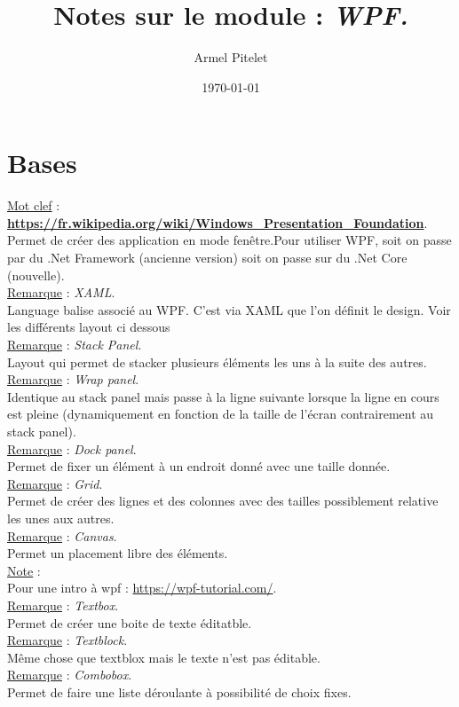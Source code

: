 \documentclass[a4paper,12pt,twoside]{article}
\title{Notes sur le module : \textit{WPF.}}
\author{Armel Pitelet}
\date{\today}
\newcommand{\urlcolor}{magenta}  %
\newcommand{\keycolor}{purple} %
\newcommand{\rem}[2]{\noindent\underline{Remarque} : \textit{#1}.\\ \indent #2}
\newcommand{\note}[1]{\noindent\underline{Note} : \\ \indent #1}
\newcommand{\keyref}[2]{\hypersetup{urlcolor=\keycolor} \href{#1}{\textbf{#2}}\hypersetup{urlcolor=\urlcolor}}
\newcommand{\keyword}[3]{\noindent\underline{Mot clef} : \keyref{#1}{#2}. \\ \indent #3}
\begin{document}
\maketitle
\tableofcontents

\section{Bases}

\keyword{WPF}{https://fr.wikipedia.org/wiki/Windows\_Presentation\_Foundation}{Permet de créer des application en mode fenêtre.Pour utiliser WPF, soit on passe par du .Net Framework (ancienne version) soit on passe sur du .Net Core (nouvelle).}\\

\rem{XAML}{Language balise associé au WPF. C'est via XAML que l'on définit le design. Voir les différents layout ci dessous}\\

\rem{Stack Panel}{Layout qui permet de stacker plusieurs éléments les uns à la suite des autres.}\\

\rem{Wrap panel}{Identique au stack panel mais passe à la ligne suivante lorsque la ligne en cours est pleine (dynamiquement en fonction de la taille de l'écran contrairement au stack panel).}\\

\rem{Dock panel}{Permet de fixer un élément à un endroit donné avec une taille donnée.}\\

\rem{Grid}{Permet de créer des lignes et des colonnes avec des tailles possiblement relative les unes aux autres.}\\

\rem{Canvas}{Permet un placement libre des éléments.}\\

\note{Pour une intro à wpf : \url{https://wpf-tutorial.com/}.}\\

\rem{Textbox}{Permet de créer une boite de texte éditatble.}\\

\rem{Textblock}{Même chose que textblox mais le texte n'est pas éditable.}\\

\rem{Combobox}{Permet de faire une liste déroulante à possibilité de choix fixes.}\\
\end{document}
